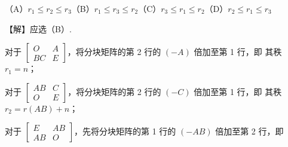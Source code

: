 （A）$r_1\le r_2\le r_3$\qquad（B）$r_1\le r_3\le r_2$\qquad（C）$r_3\le r_1\le r_2$\qquad（D）$r_2\le r_1\le r_3$

【解】应选（B）.

对于 $\begin{bmatrix}O&A\\BC&E\end{bmatrix}$，将分块矩阵的第 2 行的 $(-A)$ 倍加至第 1 行，即
其秩 $r_1=n$；

对于 $\begin{bmatrix}AB&C\\O&E\end{bmatrix}$，将分块矩阵的第 2 行的 $(-C)$ 倍加至第 1 行，即
其秩 $r_2=r(AB)+n$；

对于 $\begin{bmatrix}E&AB\\AB&O\end{bmatrix}$，先将分块矩阵的第 1 行的 $(-AB)$ 倍加至第 2 行，即

